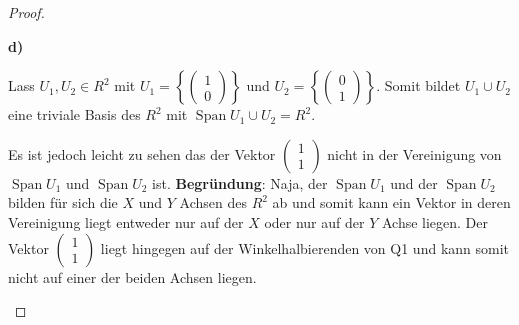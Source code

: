 \documentclass{../problemset}
\begin{document}
\begin{problem}
\begin{proof}
\begin{enumerate}
		      \textbf{d)}

		      Lass \(U_1, U_2 \in R^2\) mit \(U_1 = \left\{\begin{pmatrix}
			      1 \\0
		      \end{pmatrix}\right\}\) und \(U_2 = \left\{\begin{pmatrix}
			      0 \\1
		      \end{pmatrix}\right\}\).
		      Somit bildet \(U_1 \cup U_2\) eine triviale Basis des \(R^2\) mit \(\operatorname{Span} U_1 \cup U_2 = R^2\).

		      Es ist jedoch leicht zu sehen das der Vektor \(\begin{pmatrix}
			      1 \\ 1
		      \end{pmatrix}\) nicht in der Vereinigung von \(\operatorname{Span} U_1\) und \(\operatorname{Span} U_2\) ist.
		      \textbf{Begründung}: Naja, der \(\operatorname{Span} U_1\) und der \(\operatorname{Span} U_2\) bilden für sich die \(X\) und \(Y\)
		      Achsen des \(R^2\) ab und somit kann ein Vektor in deren Vereinigung liegt entweder nur auf der \(X\) oder nur auf der \(Y\) Achse liegen.
		      Der Vektor \(\begin{pmatrix}
			      1 \\ 1
		      \end{pmatrix}\) liegt hingegen auf der Winkelhalbierenden von Q1 und kann somit nicht auf einer der beiden Achsen liegen. \checkmark
	\end{enumerate}
\end{proof}
\end{problem}
\end{document}

